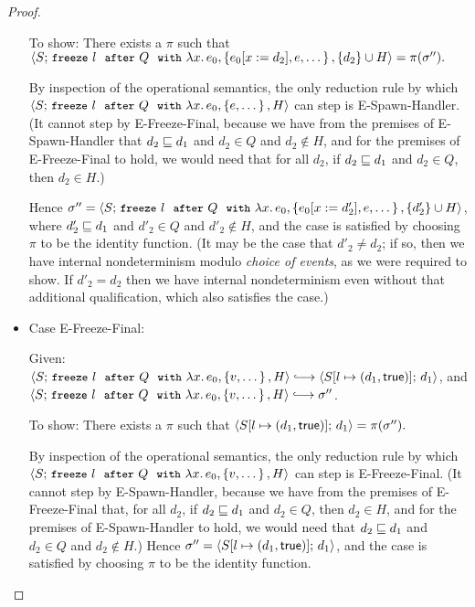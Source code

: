 \begin{proof}
\begin{itemize}
    To show: There exists a $\pi$ such that \\
    $\langle S;\, \mbox{\small{\texttt{freeze}}}~l~~{\mbox{\small{\texttt{after}}}}~Q~~{\mbox{\small{\texttt{with}}}}~\lambda x.\,e_0, \left\{e_0[x := d_2],
          e, \dots\right\}, \{d_2\}\cup H \rangle = \pi(\sigma'').$

    By inspection of the operational semantics, the only reduction
    rule by which \\
    $\langle S;\, \mbox{\small{\texttt{freeze}}}~l~~{\mbox{\small{\texttt{after}}}}~Q~~{\mbox{\small{\texttt{with}}}}~\lambda x.\,e_0, \left\{e,
          \dots\right\}, H \rangle$ can step is {\sc E-Spawn-Handler}.  (It cannot
    step by {\sc E-Freeze-Final}, because we have from the premises of
    {\sc E-Spawn-Handler} that $d_2 \sqsubseteq d_1$ and $d_2 \in Q$ and
    $d_2 \notin H$, and for the premises of {\sc E-Freeze-Final} to
    hold, we would need that for all $d_2$, if $d_2 \sqsubseteq d_1$ and
    $d_2 \in Q$, then $d_2 \in H$.)

    Hence $\sigma'' =
    \langle S;\, \mbox{\small{\texttt{freeze}}}~l~~{\mbox{\small{\texttt{after}}}}~Q~~{\mbox{\small{\texttt{with}}}}~\lambda x.\,e_0, \left\{e_0[x := d'_2],
          e, \dots\right\}, \{d'_2\}\cup H \rangle$, where $d'_2 \sqsubseteq d_1$ and
    $d'_2 \in Q$ and $d'_2 \notin H$, and the case is satisfied by
    choosing $\pi$ to be the identity function.  (It may be the case
    that $d'_2 \neq d_2$; if so, then we have internal nondeterminism
    modulo \emph{choice of events}, as we were required to show.  If
    $d'_2 = d_2$ then we have internal nondeterminism even without
    that additional qualification, which also satisfies the case.)

  \item Case {\sc E-Freeze-Final}:

    Given: $\config{S}{\freezeafterfull{l}{Q}{\lam{x}{e_0}}{\setof{v,
          \dots}}{H}} \parstepsto
    \config{\extS{S}{l}{d_1}{\frozentrue}}{d_1}$, and
    $\config{S}{\freezeafterfull{l}{Q}{\lam{x}{e_0}}{\setof{v,
          \dots}}{H}} \parstepsto \conf''$.

    To show: There exists a $\pi$ such that
    $\langle S[l \mapsto (d_1, \textsf{true})];\, d_1 \rangle = \pi(\sigma'').$

    By inspection of the operational semantics, the only reduction
    rule by which \\
    $\langle S;\, \mbox{\small{\texttt{freeze}}}~l~~{\mbox{\small{\texttt{after}}}}~Q~~{\mbox{\small{\texttt{with}}}}~\lambda x.\,e_0, \left\{v,
          \dots\right\}, H \rangle$ can step is {\sc E-Freeze-Final}.  (It cannot
    step by {\sc E-Spawn-Handler}, because we have from the premises
    of {\sc E-Freeze-Final} that, for all $d_2$, if $d_2 \sqsubseteq d_1$
    and $d_2 \in Q$, then $d_2 \in H$, and for the premises of {\sc
      E-Spawn-Handler} to hold, we would need that $d_2 \sqsubseteq d_1$
    and $d_2 \in Q$ and $d_2 \notin H$.)  Hence $\sigma'' =
    \langle S[l \mapsto (d_1, \textsf{true})];\, d_1 \rangle$, and the case is
    satisfied by choosing $\pi$ to be the identity function.


\end{itemize}
\end{proof}

